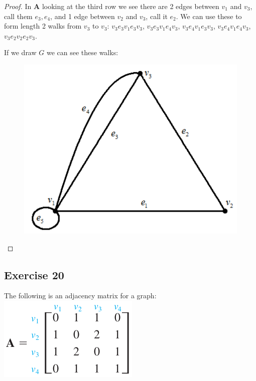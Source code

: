 \documentclass[14pt]{extarticle}
\begin{document}
\begin{proof}
    In {\bf A} looking at the third row we see there are 2 edges between \(v_1\) and \(v_3\), call them \(e_3, e_4\), and 1
    edge between \(v_2\) and \(v_3\), call it \(e_2\). We can use these to form length 2 walks from \(v_3\) to \(v_3\):
    \(v_3e_3v_1e_3v_3\), \(v_3e_3v_1e_4v_3\), \(v_3e_4v_1e_3v_3\), \(v_3e_4v_1e_4v_3\), \(v_3e_2v_2e_2v_3\).

    If we draw \(G\) we can see these walks:

    \begin{figure}[ht!]
        \centering
        \includegraphics[scale=0.15]{../images/10.2.19.c.png}
    \end{figure}
\end{proof}

\subsection{Exercise 20}
The following is an adjacency matrix for a graph: \includegraphics[scale=0.4]{../images/10.2.20.png}
\end{document}
